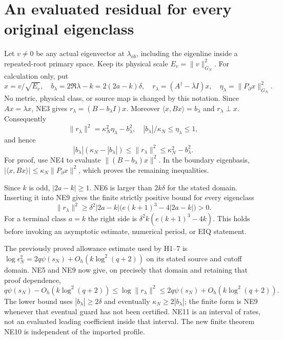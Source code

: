 \documentclass[11pt]{article}
\newcommand{\norm}[1]{\lVert#1\rVert}
\begin{document}
\section{An evaluated residual for every original eigenclass}
Let $v\ne0$ be any actual eigenvector at $\lambda_{ab}$, including
the eigenline inside a repeated-root primary space. Keep its physical
scale $E_v=\norm v_{G_N}^2$. For calculation only, put
\begin{equation}\tag{NE7}
x=v/\sqrt{E_v},\quad b_\lambda=2\Re\lambda-k=2(2a-k)\delta,
\quad r_\lambda=(A^\dagger-\overline\lambda I)x,
\quad \eta_\lambda=\norm{P_\partial x}_{G_N}^2.
\end{equation}
No metric, physical class, or source map is changed by this notation.
Since $Ax=\lambda x$, NE3 gives $r_\lambda=(B-b_\lambda I)x$.
Moreover $\langle x,Bx\rangle=b_\lambda$ and
$r_\lambda\perp x$. Consequently
\begin{equation}\tag{NE8}
\boxed{\norm{r_\lambda}^2=\kappa_N^2\eta_\lambda-b_\lambda^2,
\quad |b_\lambda|/\kappa_N\le\eta_\lambda\le1,}
\end{equation}
and hence
\begin{equation}\tag{NE9}
\boxed{|b_\lambda|(\kappa_N-|b_\lambda|)
\le\norm{r_\lambda}^2\le\kappa_N^2-b_\lambda^2.}
\end{equation}
For proof, use NE4 to evaluate $\norm{(B-b_\lambda)x}^2$.
In the boundary eigenbasis,
$|\langle x,Bx\rangle|\le\kappa_N\norm{P_\partial x}^2$,
which proves the remaining inequalities.

Since $k$ is odd, $|2a-k|\ge1$. NE6 is larger than $2k\delta$
for the stated domain. Inserting it into NE9 gives the finite
strictly positive bound for every eigenclass
\begin{equation}\tag{NE10}
\boxed{\norm{r_\lambda}^2\ge
\delta^2|2a-k|\bigl(e(k+1)^3-4|2a-k|\bigr)>0.}
\end{equation}
For a terminal class $a=k$ the right side is
$\delta^2k(e(k+1)^3-4k)$. This holds before invoking an asymptotic
estimate, numerical period, or EIQ statement.

The previously proved allowance estimate used by H1--7
\cite{Heat} is
$\log\epsilon_N^2=2q\psi(s_N)+O_h(k\log^2(q+2))$ on its stated
source and cutoff domain. NE5 and NE9 now give, on precisely that
domain and retaining that proof dependence,
\begin{equation}\tag{NE11}
q\psi(s_N)-O_h(k\log^2(q+2))
\le\log\norm{r_\lambda}^2
\le2q\psi(s_N)+O_h(k\log^2(q+2)).
\end{equation}
The lower bound uses $|b_\lambda|\ge2\delta$ and eventually
$\kappa_N\ge2|b_\lambda|$; the finite form is NE9 whenever that
eventual guard has not been certified. NE11 is an interval of rates,
not an evaluated leading coefficient inside that interval. The new
finite theorem NE10 is independent of the imported profile.
\end{document}
